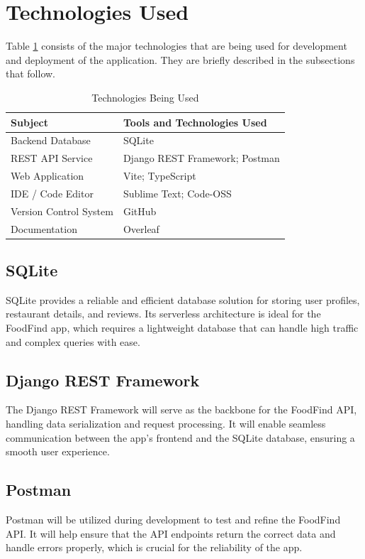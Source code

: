 \documentclass[12pt, a4paper, oneside]{article}
\begin{document}
\section{Technologies Used}
 Table \ref{table:tech} consists of the major technologies that are being used for development and deployment of the application. They are briefly described in the subsections that follow.

 \renewcommand{\arraystretch}{1.5}
 \begin{table}[H]
 \begin{tabular}{|l|l|}
 \hline
 \rowcolor[HTML]{C0C0C0} 
 \textbf{Subject}    & \textbf{Tools and Technologies Used} \\ \hline
 Backend Database            & SQLite                        \\ \hline
 REST API Service    & Django REST Framework; Postman        \\ \hline
 Web Application  & Vite; TypeScript                 \\ \hline
 IDE / Code Editor& Sublime Text; Code-OSS  \\ \hline
 Version Control System& GitHub  \\ \hline
 Documentation & Overleaf \\ \hline
 \end{tabular}
 \caption{Technologies Being Used}
 \label{table:tech}
 \end{table}

 \subsection{SQLite}
   SQLite provides a reliable and efficient database solution for storing user profiles, restaurant details, and reviews. Its serverless architecture is ideal for the FoodFind app, which requires a lightweight database that can handle high traffic and complex queries with ease.

  \subsection{Django REST Framework}
    The Django REST Framework will serve as the backbone for the FoodFind API, handling data serialization and request processing. It will enable seamless communication between the app's frontend and the SQLite database, ensuring a smooth user experience.

  \subsection{Postman}
    Postman will be utilized during development to test and refine the FoodFind API. It will help ensure that the API endpoints return the correct data and handle errors properly, which is crucial for the reliability of the app.
\end{document}

